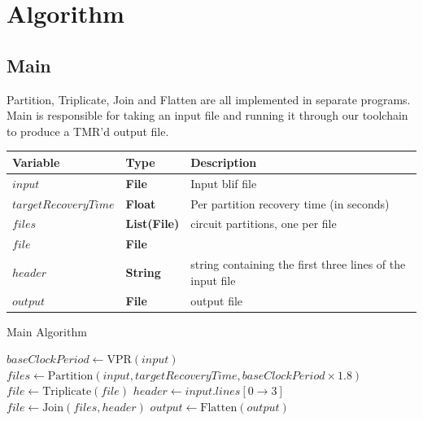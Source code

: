 \documentclass[12pt,final,oneside]{dwThesis} %
\begin{document}
   \newpage 
   \section{Algorithm}
   \label{secAlgorithm} 
   \subsection{Main}

   Partition, Triplicate, Join and Flatten are all implemented in separate
   programs. Main is responsible for taking an input file and running it
   through our toolchain to produce a TMR'd output file.



   \begin{algorithm}

      \begin{center}

         \begin{tabular}
            {lll} \toprule Variable &
            Type & Description\\
            \midrule $input$ & \textbf{File} &  Input blif
            file\\
            $targetRecoveryTime$ & \textbf{Float} &  Per partition
            recovery time (in seconds) \\
            $files$ & \textbf{List(File)} &
            circuit partitions, one per file \\
            $file$ & \textbf{File} &  \\

            $header$ & \textbf{String} &  string containing the first three
            lines of the input file \\
            $output$ & \textbf{File} &  output
            file\\
            \bottomrule 
         \end{tabular}

      \end{center}
      \caption{Main
         Algorithm}\label{main} 
      \begin{algorithmic}[1]
         \State $baseClockPeriod \gets $VPR$(input)$
         \State $files \gets
         \mbox{Partition}(input, targetRecoveryTime, baseClockPeriod\times1.8)$  
         \State $file \gets \mbox{Triplicate}(file)$ \EndFor 
         \State
         $header \gets input.lines[0\to 3]$ 
         \State $file \gets
         \mbox{Join}(files, header)$ 
         \State $output \gets
         \mbox{Flatten}(output)$ \EndProcedure 
      \end{algorithmic}


   \end{algorithm}
\end{document}
